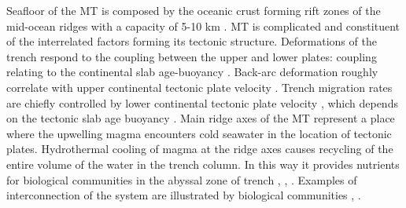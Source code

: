 \documentclass[11pt,a4paper]{report}
\begin{document}
Seafloor of the \ac{MT} is composed by the oceanic crust forming rift zones of the mid-ocean ridges with a capacity of 5-10 km \cite{Morgan1974}. \ac{MT} is complicated and constituent of the interrelated factors forming its tectonic structure. Deformations of the trench respond to the coupling between the upper and lower plates: coupling relating to the continental slab age-buoyancy \cite{RuffKanamori1980}. Back-arc deformation roughly correlate with upper continental tectonic plate velocity \cite{HeuretLallemand2005}. Trench migration rates are chiefly controlled by lower continental tectonic plate velocity \cite{Lallemandetal2008}, which depends on the tectonic slab age buoyancy \cite{Chase1978}. Main ridge axes of the \ac{MT} represent a place where the upwelling magma encounters cold seawater in the location of tectonic plates. Hydrothermal cooling of magma at the ridge axes causes recycling of the entire volume of the water in the trench column. In this way it provides nutrients for biological communities in the abyssal zone of trench \cite{Langetal2014}, \cite{Luoetal2017}, \cite{Ichinoetal2015}. Examples of interconnection of the system are illustrated by biological communities \cite{Galloetal2015}, \cite{Laceyetal2016}. 
\end{document}
